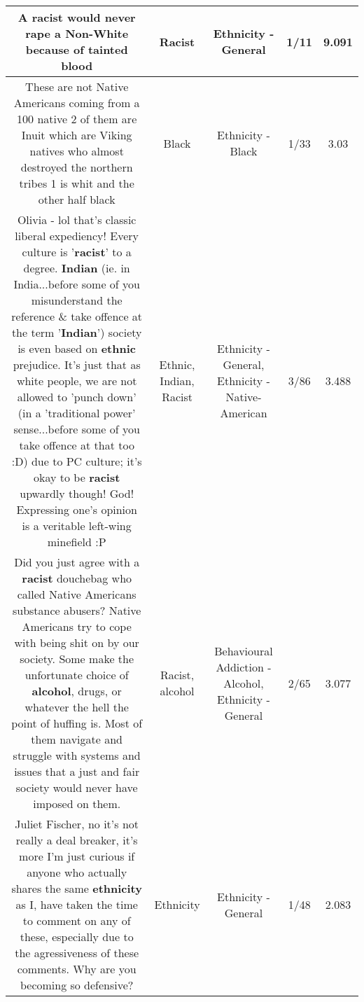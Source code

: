 \documentclass[11pt]{article}
\newlength\mylength
\begin{document}
\begin{center}
\begin{longtable}{|C{.65\mylength}|C{.30\mylength}|C{.12\mylength}|C{.12\mylength}|C{.12\mylength}|}
  \small A \textbf{racist} would never rape a Non-White because of tainted blood\normalsize   & Racist & Ethnicity - General & 1/11 & 9.091 \\  \hline
  \small These are not Native Americans coming from a 100 native 2 of them are Inuit which are Viking natives who almost destroyed the northern tribes 1 is whit and the other half black\normalsize   & Black & Ethnicity - Black & 1/33 & 3.03 \\  \hline
  \small Olivia - lol that's classic liberal expediency! Every culture is '\textbf{racist}' to a degree. \textbf{Indian} (ie. in India...before some of you misunderstand the reference \& take offence at the term '\textbf{Indian}') society is even based on \textbf{ethnic} prejudice. It's just that as white people, we are not allowed to 'punch down' (in a 'traditional power' sense...before some of you take offence at that too :D) due to PC culture; it's okay to be \textbf{racist} upwardly though! God! Expressing one's opinion is a veritable left-wing minefield :P\normalsize   & Ethnic, Indian, Racist & Ethnicity - General, Ethnicity - Native-American & 3/86 & 3.488 \\  \hline
  \small Did you just agree with a \textbf{racist} douchebag who called Native Americans substance abusers? Native Americans try to cope with being shit on by our society. Some make the unfortunate choice of \textbf{alcohol}, drugs, or whatever the hell the point of huffing is. Most of them navigate and struggle with systems and issues that a just and fair society would never have imposed on them.\normalsize   & Racist, alcohol & Behavioural Addiction - Alcohol, Ethnicity - General & 2/65 & 3.077 \\  \hline
  \small Juliet Fischer, no it's not really a deal breaker, it's more I'm just curious if anyone who actually shares the same \textbf{ethnicity} as I, have taken the time to comment on any of these, especially due to the agressiveness of these comments. Why are you becoming so defensive?\normalsize   & Ethnicity & Ethnicity - General & 1/48 & 2.083 \\  \hline

\end{longtable}
\end{center}
\end{document}

